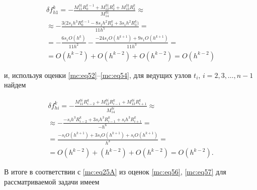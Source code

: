 \begin{multline}

\label{mc:eq56}  

\delta f_{h1}^k=

   -\frac{M_{11}^{31} R_{0}^{k-1} + M_{12}^{31} R_{2}^k + M_{13}^{31} R_{3}^k}{M_{14}^{31}}

\approx

\\

\approx

-\frac{3\bigl(2s_1h^3 R_{0}^{k-1} - 8s_1h^2 R_{2}^k + 3s_1h^2 R_{3}^k\bigr)}{11h^5}=

\\=

-\frac{6s_1 O(h^{k})}{11h^2}

-\frac{-24s_1 O(h^{k+1}) +

9s_1 O(h^{k+1})}{11h^3}

=

\\=

O(h^{k-2})+O(h^{k-2})+O(h^{k-2})=O(h^{k-2})

\end{multline}

и, используя оценки \eqref{mc:eq52}--\eqref{mc:eq54}, для ведущих узлов $   t_i$, $i=2,  3,  \dots,  n-1$ найдем 

\begin{multline}

\label{mc:eq57}  

\delta f_{hi}^k=

   -\frac{M_{11}^{3i} R_{i-2}^k + M_{12}^{3i} R_{i-1}^k + M_{13}^{3i} R_{i+1}^k}{M_{14}^{3i}}\approx

\\

\approx

-\frac{-s_ih^3 R_{i-2}^k + 3s_ih^3 R_{i-1}^k + s_ih^3 R_{i+1}^k}{-h^6}

=

\\

=

\frac{-s_i O(h^{k+1}) + 3s_i O(h^{k+1})+ s_i O(h^{k+1})}{h^3}

=\\=

O(h^{k-2})+(h^{k-2})+O(h^{k-2})=O(h^{k-2}).

\end{multline}



В итоге  в соответствии с \eqref{mc:eq25A} из оценок \eqref{mc:eq56}, \eqref{mc:eq57} для рассматриваемой задачи имеем

